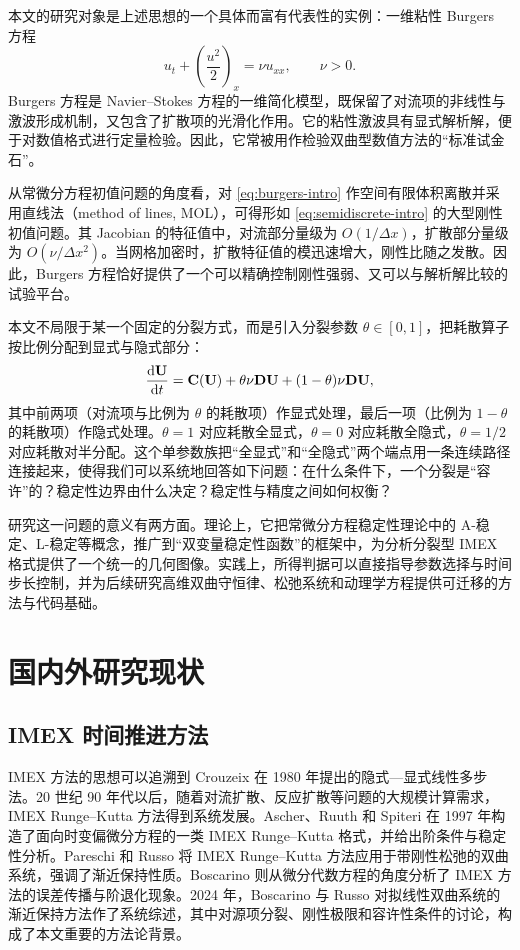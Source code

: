 本文的研究对象是上述思想的一个具体而富有代表性的实例：一维粘性 Burgers 方程
\begin{equation}
  u_t+\left(\frac{u^2}{2}\right)_x=\nu u_{xx},\qquad \nu>0.
  \label{eq:burgers-intro}
\end{equation}
Burgers 方程是 Navier--Stokes 方程的一维简化模型，既保留了对流项的非线性与激波形成机制，又包含了扩散项的光滑化作用。它的粘性激波具有显式解析解，便于对数值格式进行定量检验。因此，它常被用作检验双曲型数值方法的“标准试金石”。

从常微分方程初值问题的角度看，对 \eqref{eq:burgers-intro} 作空间有限体积离散并采用直线法（method of lines, MOL），可得形如 \eqref{eq:semidiscrete-intro} 的大型刚性初值问题。其 Jacobian 的特征值中，对流部分量级为 $O(1/\Delta x)$，扩散部分量级为 $O(\nu/\Delta x^2)$。当网格加密时，扩散特征值的模迅速增大，刚性比随之发散。因此，Burgers 方程恰好提供了一个可以精确控制刚性强弱、又可以与解析解比较的试验平台。

本文不局限于某一个固定的分裂方式，而是引入分裂参数 $\theta\in[0,1]$，把耗散算子按比例分配到显式与隐式部分：
\begin{equation}
  \frac{\mathrm{d} {\mathbf{U}}}{\mathrm{d} t}
  ={\mathbf{C}}({\mathbf{U}})+\theta\nu{\mathbf{D}}{\mathbf{U}}+(1-\theta)\nu{\mathbf{D}}{\mathbf{U}},
  \label{eq:theta-family-intro}
\end{equation}
其中前两项（对流项与比例为 $\theta$ 的耗散项）作显式处理，最后一项（比例为 $1-\theta$ 的耗散项）作隐式处理。$\theta=1$ 对应耗散全显式，$\theta=0$ 对应耗散全隐式，$\theta=1/2$ 对应耗散对半分配。这个单参数族把“全显式”和“全隐式”两个端点用一条连续路径连接起来，使得我们可以系统地回答如下问题：在什么条件下，一个分裂是“容许”的？稳定性边界由什么决定？稳定性与精度之间如何权衡？

研究这一问题的意义有两方面。理论上，它把常微分方程稳定性理论中的 A-稳定、L-稳定等概念，推广到“双变量稳定性函数”的框架中，为分析分裂型 IMEX 格式提供了一个统一的几何图像。实践上，所得判据可以直接指导参数选择与时间步长控制，并为后续研究高维双曲守恒律、松弛系统和动理学方程提供可迁移的方法与代码基础。

\section{国内外研究现状}

\subsection{IMEX 时间推进方法}

IMEX 方法的思想可以追溯到 Crouzeix 在 1980 年提出的隐式—显式线性多步法\cite{crouzeix1980}。20 世纪 90 年代以后，随着对流扩散、反应扩散等问题的大规模计算需求，IMEX Runge--Kutta 方法得到系统发展。Ascher、Ruuth 和 Spiteri 在 1997 年构造了面向时变偏微分方程的一类 IMEX Runge--Kutta 格式，并给出阶条件与稳定性分析\cite{ascher1997}。Pareschi 和 Russo 将 IMEX Runge--Kutta 方法应用于带刚性松弛的双曲系统，强调了渐近保持性质\cite{pareschi2005}。Boscarino 则从微分代数方程的角度分析了 IMEX 方法的误差传播与阶退化现象\cite{boscarino2007}。2024 年，Boscarino 与 Russo 对拟线性双曲系统的渐近保持方法作了系统综述\cite{boscarino2024}，其中对源项分裂、刚性极限和容许性条件的讨论，构成了本文重要的方法论背景。

